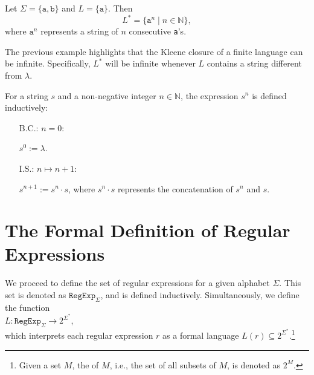 \exampleEng
Let \( \Sigma = \{ \texttt{a}, \texttt{b} \} \) and \( L = \{ \texttt{a} \} \). Then
\[
L^* = \{ \texttt{a}^n \mid n \in \mathbb{N} \},
\]
where \( \texttt{a}^n \) represents a string of \( n \) consecutive \texttt{a}'s. \eox

The previous example highlights that the Kleene closure of a finite language can be infinite. Specifically, 
$L^*$ will be infinite whenever $L$ contains a string different from $\lambda$. 

\begin{Definition}
For a string \( s \) and a non-negative integer \( n \in \mathbb{N} \), the expression \( s^n \) is defined inductively:
\begin{enumerate}
\item[B.C.:] \( n = 0 \):

             \( s^0 := \lambda \).
\item[I.S.:] \( n \mapsto n + 1 \):

             \( s^{n+1} := s^n \cdot s \),  \quad where \( s^n \cdot s \) represents the concatenation of \( s^n \) and \( s \).
\eox
\end{enumerate}
\end{Definition}



\section{The Formal Definition of Regular Expressions}
We proceed to define the set of regular expressions for a given alphabet \( \Sigma \). This set is denoted as
\( \texttt{RegExp}_\Sigma \), and is defined inductively. Simultaneously, we define the function 
\\[0.2cm]
\hspace*{1.3cm}
$L: \texttt{RegExp}_\Sigma \rightarrow 2^{\Sigma^*}$,
\\[0.2cm]
which interprets each regular expression \( r \) as a formal language \( L(r) \subseteq 2^{\Sigma^*} \).\footnote{
  Given a set \( M \), the  of \( M \), i.e., the set of all subsets of \( M \), is denoted as \( 2^M \).
}
\pagebreak

